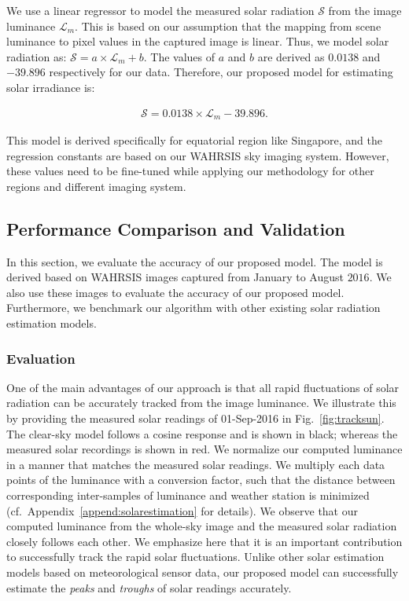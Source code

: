 We use a linear regressor to model the measured solar radiation $\mathcal{S}$ from the image luminance $\mathcal{L}_m$. This is based on our assumption that the mapping from scene luminance to pixel values in the captured image is linear. Thus, we model solar radiation as: $\mathcal{S} = a\times{\mathcal{L}}_m + b$. The values of $a$ and $b$ are derived as $0.0138$ and $-39.896$ respectively for our data. Therefore, our proposed model for estimating solar irradiance is:

\begin{align}
\label{eq:propmodel}
\mathcal{S} = 0.0138\times{\mathcal{L}}_m - 39.896.
\end{align}

This model is derived specifically for equatorial region like Singapore, and the regression constants are based on our WAHRSIS sky imaging system. However, these values need to be fine-tuned while applying our methodology for other regions and different imaging system.

\subsection{Performance Comparison and Validation}
\label{sec:comparemodels}
In this section, we evaluate the accuracy of our proposed model. The model is derived based on WAHRSIS images captured 
from January to August $2016$. We also use these images to evaluate the accuracy of our proposed model. Furthermore, we benchmark our algorithm with other existing solar radiation estimation models.

\subsubsection{Evaluation}

One of the main advantages of our approach is that all rapid fluctuations of solar radiation can be accurately tracked from the image luminance. We illustrate this by providing the measured solar readings of 01-Sep-2016 in Fig.~\ref{fig:tracksun}. The clear-sky model follows a cosine response and is shown in black; whereas the measured solar recordings is shown in red. We normalize our computed luminance in a manner that matches the measured solar readings. We multiply each data points of the luminance with a conversion factor, such that the distance between corresponding inter-samples of luminance and weather station is minimized (cf.\ Appendix~\ref{append:solarestimation} for details). We observe that our computed luminance from the whole-sky image and the measured solar radiation closely follows each other. We emphasize here that it is an important contribution to successfully track the rapid solar fluctuations. Unlike other solar estimation models based on meteorological sensor data, our proposed model can successfully estimate the \emph{peaks} and \emph{troughs} of solar readings accurately. 


